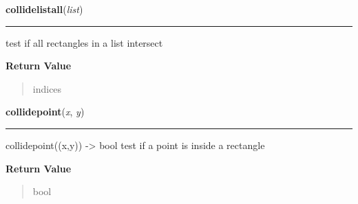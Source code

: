 \hspace{.8\funcindent}\begin{boxedminipage}{\funcwidth}

    \raggedright \textbf{collidelistall}(\textit{list})

    \vspace{-1.5ex}

    \rule{\textwidth}{0.5\fboxrule}
\setlength{\parskip}{2ex}
    test if all rectangles in a list intersect

\setlength{\parskip}{1ex}
      \textbf{Return Value}
    \vspace{-1ex}

      \begin{quote}
      indices

      \end{quote}

    \end{boxedminipage}

    \label{pygame:Rect:collidepoint}

    \vspace{0.5ex}

\hspace{.8\funcindent}\begin{boxedminipage}{\funcwidth}

    \raggedright \textbf{collidepoint}(\textit{x}, \textit{y})

    \vspace{-1.5ex}

    \rule{\textwidth}{0.5\fboxrule}
\setlength{\parskip}{2ex}
    collidepoint((x,y)) -{\textgreater} bool test if a point is inside a 
    rectangle

\setlength{\parskip}{1ex}
      \textbf{Return Value}
    \vspace{-1ex}

      \begin{quote}
      bool

      \end{quote}

    \end{boxedminipage}

    \label{pygame:Rect:colliderect}

    \vspace{0.5ex}

